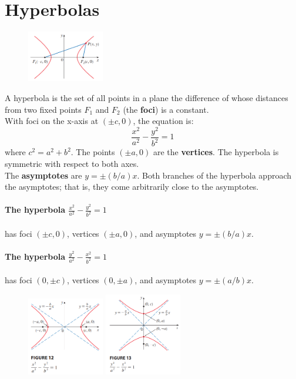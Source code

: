 \documentclass{article}
\begin{document}
\section*{Hyperbolas}
\begin{figure}[htbp]
    \centering
    \includegraphics[width=0.3\textwidth]{graph56.png}
\end{figure}
A hyperbola is the set of all points in a plane the difference of whose distances from two fixed points $F_1$ and $F_2$ (the \textbf{foci}) is a constant. 
\\With foci on the x-axis at $(\pm c, 0)$, the equation is:
\[
\frac{x^2}{a^2} - \frac{y^2}{b^2} = 1
\]
where $c^2 = a^2 + b^2$. The points $(\pm a,0)$ are the \textbf{vertices}.  The hyperbola is symmetric with respect to both axes. 
\\The \textbf{asymptotes} are $y = \pm(b/a)x$. Both branches of the 
hyperbola approach the asymptotes; that is, they come arbitrarily close to the asymptotes.


\paragraph{The hyperbola $\frac{x^2}{a^2} - \frac{y^2}{b^2} = 1$} has foci $(\pm c, 0)$, vertices $(\pm a, 0)$, and asymptotes $y = \pm(b/a)x$.

\paragraph{The hyperbola $\frac{y^2}{a^2} - \frac{x^2}{b^2} = 1$} has foci $(0, \pm c)$, vertices $(0, \pm a)$, and asymptotes $y = \pm(a/b)x$.
\begin{figure}[htbp]
    \centering
    \includegraphics[width=0.3\textwidth]{graph57.png}
    \includegraphics[width=0.3\textwidth]{graph58.png}
\end{figure}
\end{document}
